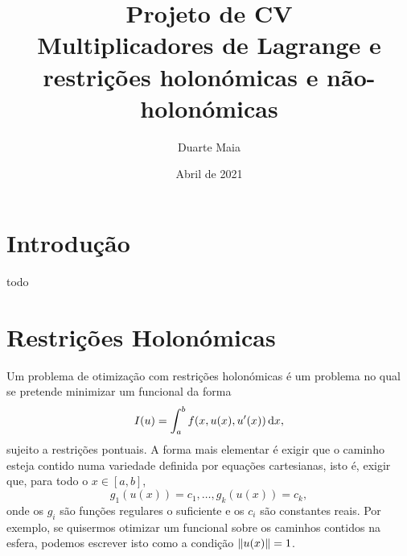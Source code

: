 \documentclass{article}
\title{Projeto de CV\\
\large Multiplicadores de Lagrange e restrições holonómicas e não-holonómicas}
\author{Duarte Maia}
\date{Abril de 2021}
\theoremstyle{nonumberplain}
\DeclarePairedDelimiter\norm{\lVert}{\rVert}
\begin{document}
	\maketitle

	\section{Introdução}

	todo

	\section{Restrições Holonómicas}

	Um problema de otimização com restrições holonómicas é um problema no qual se pretende minimizar um funcional da forma
	\[I(u) = \int_a^b f(x,u(x),u'(x)) \dl x,\]
	sujeito a restrições pontuais. A forma mais elementar é exigir que o caminho esteja contido numa variedade definida por equações cartesianas, isto é, exigir que, para todo o $x \in [a,b]$,
	\[g_1(u(x)) = c_1, \dots, g_k(u(x)) = c_k,\]
	onde os $g_i$ são funções regulares o suficiente e os $c_i$ são constantes reais. Por exemplo, se quisermos otimizar um funcional sobre os caminhos contidos na esfera, podemos escrever isto como a condição $\norm{u(x)} = 1$.
\end{document}
